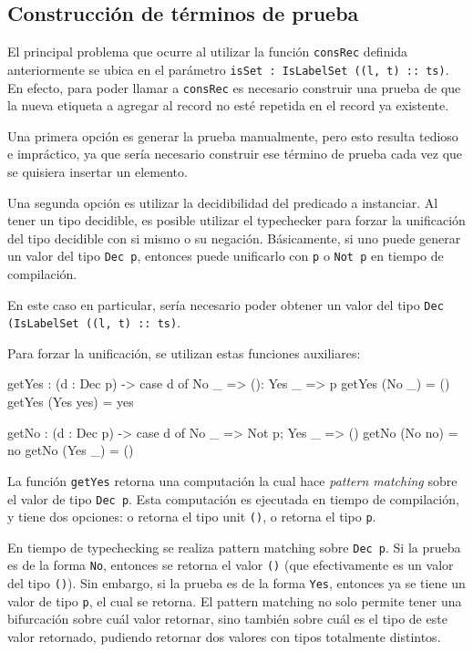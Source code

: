 \subsection{Construcción de términos de prueba}

El principal problema que ocurre al utilizar la función \texttt{consRec} definida anteriormente se ubica en el parámetro \texttt{isSet : IsLabelSet ((l, t) :: ts)}. En efecto, para poder llamar a \texttt{consRec} es necesario construir una prueba de que la nueva etiqueta a agregar al record no esté repetida en el record ya existente.

Una primera opción es generar la prueba manualmente, pero esto resulta tedioso e impráctico, ya que sería necesario construir ese término de prueba cada vez que se quisiera insertar un elemento.

Una segunda opción es utilizar la decidibilidad del predicado a instanciar. Al tener un tipo decidible, es posible utilizar el typechecker para forzar la unificación del tipo decidible con si mismo o su negación. Básicamente, si uno puede generar un valor del tipo \texttt{Dec p}, entonces puede unificarlo con \texttt{p} o \texttt{Not p} en tiempo de compilación.

En este caso en particular, sería necesario poder obtener un valor del tipo \texttt{Dec (IsLabelSet ((l, t) :: ts)}.

Para forzar la unificación, se utilizan estas funciones auxiliares:

\begin{code}
getYes : (d : Dec p) ->
  case d of { No _ => (): Yes _ => p }
getYes (No _) = ()
getYes (Yes yes) = yes

getNo : (d : Dec p) ->
  case d of { No _ => Not p; Yes _ => () }
getNo (No no) = no
getNo (Yes _) = ()
\end{code}

La función \texttt{getYes} retorna una computación la cual hace \textit{pattern matching} sobre el valor de tipo \texttt{Dec p}. Esta computación es ejecutada en tiempo de compilación, y tiene dos opciones: o retorna el tipo unit \texttt{()}, o retorna el tipo \texttt{p}.

En tiempo de typechecking se realiza pattern matching sobre \texttt{Dec p}. Si la prueba es de la forma \texttt{No}, entonces se retorna el valor \texttt{()} (que efectivamente es un valor del tipo \texttt{()}). Sin embargo, si la prueba es de la forma \texttt{Yes}, entonces ya se tiene un valor de tipo \texttt{p}, el cual se retorna. El pattern matching no solo permite tener una bifurcación sobre cuál valor retornar, sino también sobre cuál es el tipo de este valor retornado, pudiendo retornar dos valores con tipos totalmente distintos.

